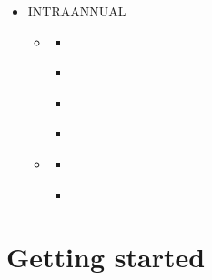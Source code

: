 \documentclass[letterpaper,10pt,english]{jupyterBook}
\begin{document}
\begin{itemize}
\item {} 
\sphinxAtStartPar
INTRA\sphinxhyphen{}ANNUAL

\begin{itemize}
\item {} 
\sphinxAtStartPar
{\hyperref[\detokenize{notebooks/SL_intra-annual::doc}]{}}
\begin{itemize}
\item {} 
\sphinxAtStartPar
{\hyperref[\detokenize{notebooks/regional_and_local/SL_anomaly_intra-annual::doc}]{}}

\item {} 
\sphinxAtStartPar
{\hyperref[\detokenize{notebooks/regional_and_local/SL_Rankings_intra-annual::doc}]{}}

\item {} 
\sphinxAtStartPar
{\hyperref[\detokenize{notebooks/regional_and_local/SL_Extremes_intra-annual::doc}]{}}

\item {} 
\sphinxAtStartPar
{\hyperref[\detokenize{notebooks/regional_and_local/SL_Components_intra-annual::doc}]{}}

\end{itemize}

\item {} 
\sphinxAtStartPar
{\hyperref[\detokenize{notebooks/Flood_intra-annual::doc}]{}}
\begin{itemize}
\item {} 
\sphinxAtStartPar
{\hyperref[\detokenize{notebooks/FloodFrequency_intra-annual::doc}]{}}

\item {} 
\sphinxAtStartPar
{\hyperref[\detokenize{notebooks/FloodDuration_intra-annual::doc}]{}}

\end{itemize}

\end{itemize}
\end{itemize}

\sphinxstepscope


\part{Getting started}
\end{document}
